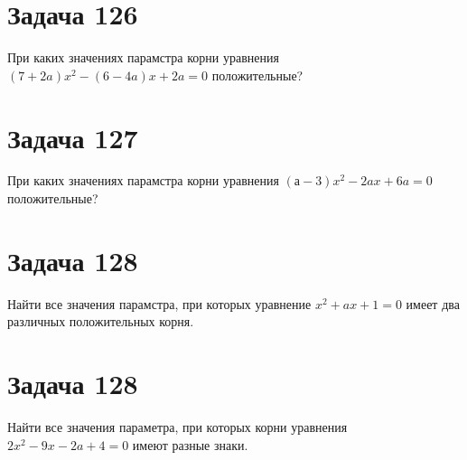 \documentclass[a4paper,12pt]{article}
\begin{document}
\section{Задача 126}

При каких значениях парамстра корни уравнения
$(7 + 2a)x^2 - (6 - 4a)x + 2a = 0$ положительные?

\section{Задача 127}

При каких значениях парамстра корни уравнения
$(а - 3)x^2 - 2ax + 6a = 0$ положительные?

\section{Задача 128}

Найти все значения парамстра, при которых уравнение
$x^2 + ax + 1 = 0$ имеет два различных положительных корня.

\section{Задача 128}

Найти все значения параметра, при которых корни уравнения
$2x^2 - 9x - 2a + 4 = 0$ имеют разные знаки.
\end{document}
